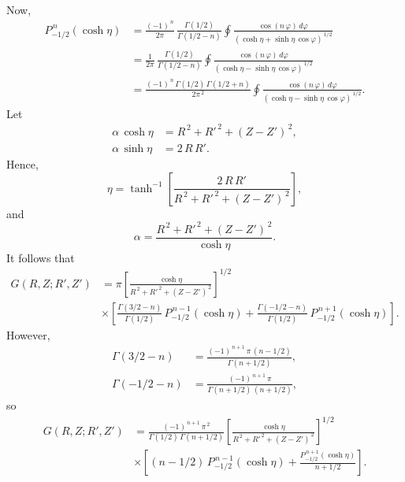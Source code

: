 \documentclass[12pt]{article}
\begin{document}
Now, 
\begin{align}
P^{\,n}_{-1/2}(\cosh\eta) &= \frac{(-1)^{\,n}}{2\pi}\,\frac{\Gamma(1/2)}{\Gamma(1/2-n)}\oint \frac{\cos(n\,\varphi)\,d\varphi}{(\cosh\eta+\sinh\eta\,\cos\varphi)^{\,1/2}}\nonumber\\[0.5ex]
 &=\frac{1}{2\pi}\,\frac{\Gamma(1/2)}{\Gamma(1/2-n)}\oint \frac{\cos(n\,\varphi)\,d\varphi}{(\cosh\eta-\sinh\eta\,\cos\varphi)^{\,1/2}}\nonumber\\[0.5ex]
 &=\frac{(-1)^{\,n}\,\Gamma(1/2)\,\Gamma(1/2+n)}{2\pi^{\,2}}\oint
 \frac{\cos(n\,\varphi)\,d\varphi}{(\cosh\eta-\sinh\eta\,\cos\varphi)^{\,1/2}}.
\end{align}
Let
\begin{align}
\alpha\,\cosh\eta &= R^{\,2} +R'^{\,2} + (Z-Z')^{\,2},\\[0.5ex]
\alpha\,\sinh\eta &= 2\,R\,R'.
\end{align}
Hence,
\begin{equation}
\eta = \tanh^{-1}\left[\frac{2\,R\,R'}{R^{\,2}+R'^{\,2}+(Z-Z')^{\,2}}\right],
\end{equation}
and
\begin{equation}
\alpha = \frac{R^{\,2} +R'^{\,2} + (Z-Z')^{\,2}}{\cosh\eta}.
\end{equation}
It follows that
\begin{align}
G(R,Z;R',Z')&=\pi\left[\frac{\cosh\eta}{R^{\,2}+R'^{\,2}+(Z-Z')^{\,2}}\right]^{1/2}\nonumber\\[0.5ex]
&
\times\left[\frac{\Gamma(3/2-n)}{\Gamma(1/2)}\,P_{-1/2}^{\,n-1}(\cosh\eta)
+ \frac{\Gamma(-1/2-n)}{\Gamma(1/2)}\,P_{-1/2}^{\,n+1}(\cosh\eta)\right].
\end{align}
However,
\begin{align}
{\Gamma}(3/2-n)  &=\frac{(-1)^{\,n+1}\,\pi\,(n-1/2)}{\Gamma(n+1/2)},\\[0.5ex]
{\Gamma}(-1/2-n)&= \frac{(-1)^{\,n+1}\,\pi}{\Gamma(n+1/2)\,(n+1/2)},
\end{align}
so
\begin{align}
G(R,Z;R',Z')&= \frac{(-1)^{\,n+1}\,\pi^{\,2}}{\Gamma(1/2)\,\Gamma(n+1/2)}
\left[\frac{\cosh\eta}{R^{\,2}+R'^{\,2}+(Z-Z')^{\,2}}\right]^{1/2}\nonumber\\[0.5ex]
&\times\left[(n-1/2)\,P_{-1/2}^{\,n-1}(\cosh\eta)+
\frac{P_{-1/2}^{\,n+1}(\cosh\eta)}{n+1/2}\right].
\end{align}
\end{document}
